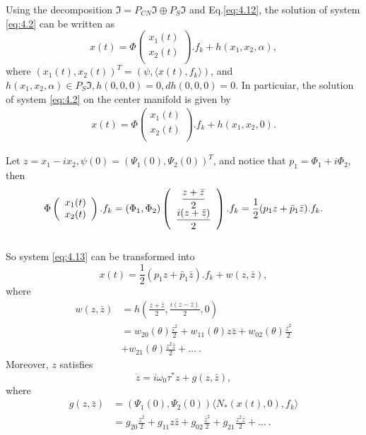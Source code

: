 \documentclass[10pt]{amsart}
\theoremstyle{definition}
\begin{document}
Using the decomposition $\Im=P_{CN}\Im\oplus P_S \Im$ and Eq.\eqref{eq:4.12}, the solution of system \eqref{eq:4.2} can be written as\\
$$x(t)=\Phi \left(
    \begin{array}{c}
  {\displaystyle{x_1(t)}} \\
  {\displaystyle{x_2(t)}}\\
\end{array}
\right).f_k+h(x_1,x_2,\alpha),$$
where $(x_1(t),x_2(t))^T=(\psi,\langle x(t),f_k \rangle)$, and $h(x_1,x_2,\alpha) \in P_S\Im,h(0,0,0)=0, dh(0,0,0)=0$. In particuiar, the solution of system \eqref{eq:4.2} on the center manifold is given by\\
\begin{align}\label{eq:4.13}
x(t)=\Phi \left(
    \begin{array}{c}
  {\displaystyle{x_1(t)}} \\
  {\displaystyle{x_2(t)}}\\
\end{array}
\right).f_k+h(x_1,x_2,0).
\end{align}

Let $z=x_1-ix_2, \psi(0)=(\Psi_1(0),\Psi_2(0))^T$, and notice that $p_1=\Phi_1+i\Phi_2$, then\\
$$\Phi \left(
    \begin{array}{c}
  {\displaystyle{x_1(t)}} \\
  {\displaystyle{x_2(t)}}\\
\end{array}
\right).f_k=(\Phi_1,\Phi_2) \left(
    \begin{array}{c}
  {\displaystyle{\frac{z+\bar{z}}{2}}} \\
  {\displaystyle{\frac{i(z+\bar{z})}{2}}}\\
\end{array}
\right).f_k\\
=\frac{1}{2}(p_1z+{\bar{p}}_1 \bar z).f_k.$$\\
So system \eqref{eq:4.13} can be transformed into
\begin{equation}\label{eq:4.14}
x(t)=\frac{1}{2}(p_1z+{\bar{p}}_1 \bar z).f_k+w(z, \bar z),
\end{equation}
where
\begin{align*}
w(z,\bar z) &= h(\frac{z+\bar z}{2},\frac{i(z-\bar z)}{2},0)\\
&= w_{20}(\theta)\frac{z^2}{2}+w_{11}(\theta)z \bar z + w_{02}(\theta)\frac{{\bar z}^2}{2}\\
&+w_{21}(\theta)\frac{z^2 \bar z}{2}+\ldots~.
\end{align*}
Moreover, $z$ satisfies
\begin{equation}\label{eq:4.15}
\dot z=i\omega_0 \tau^* z+g(z,\bar z),
\end{equation}
where
\begin{align}\label{eq:4.16}
g(z,\bar z)&=(\Psi_1(0),\Psi_2(0)) \langle N_*(x(t),0),f_k \rangle \nonumber \\
&=g_{20}\frac{z^2}{2}+g_{11}z \bar z + g_{02}\frac{{\bar z}^2}{2}+g_{21}\frac{z^2 \bar z}{2}+\ldots~.
\end{align}
\end{document}
